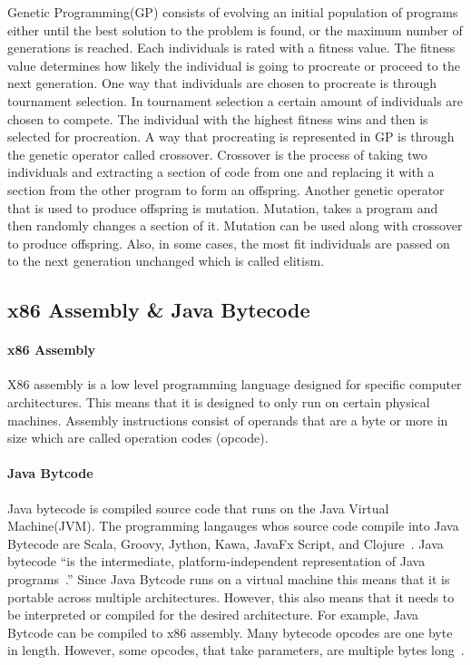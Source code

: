 \documentclass{sig-alternate}
\begin{document}
Genetic Programming(GP) consists of evolving an initial population of programs either until the best solution to the problem is found, or the maximum number of generations is reached. Each individuals is rated with a fitness value. The fitness value determines how likely the individual is going to procreate or proceed to the next generation. One way that individuals are chosen to procreate is through tournament selection. In tournament selection a certain amount of individuals are chosen to compete. The individual with the highest fitness wins and then is selected for procreation. A way that procreating is represented in GP is through the genetic operator called crossover. Crossover is the process of taking two individuals and extracting a section of code from one and replacing it with a section from the other program to form an offspring. Another genetic operator that is used to produce offspring is mutation. Mutation, takes a program and then randomly changes a section of it. Mutation can be used along with crossover to produce offspring. Also, in some cases, the most fit individuals are passed on to the next generation unchanged which is called elitism.


\subsection{x86 Assembly \& Java Bytecode}
\paragraph{x86 Assembly}
X86 assembly is a low level programming language designed for specific computer architectures. This means that it is designed to only run on certain physical machines. Assembly instructions consist of operands that are a byte or more in size which are called operation codes (opcode).

\paragraph{Java Bytcode}
Java bytecode is compiled source code that runs on the Java Virtual Machine(JVM). The programming langauges whos source code compile into Java Bytecode are Scala, Groovy, Jython, Kawa, JavaFx Script, and Clojure~\cite{FINCH:2011}. Java bytecode ``is the intermediate, platform-independent representation of Java programs~\cite{VIII:2011}.'' Since Java Bytcode runs on a virtual machine this means that it is portable across multiple architectures. However, this also means that it needs to be interpreted or compiled for the desired architecture. For example, Java Bytcode can be compiled to x86 assembly. Many bytecode opcodes are one byte in length. However, some opcodes, that take parameters, are multiple bytes long~\cite{JavaBytecode:2014}.
\end{document}
